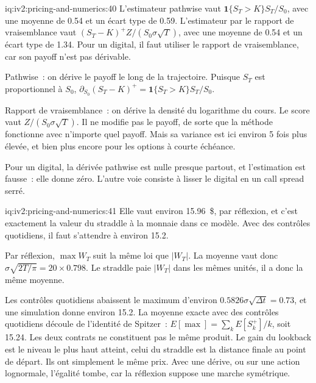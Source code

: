 \begin{solution}{iq:iv2:pricing-and-numerics:40}
L'estimateur pathwise vaut $\mathbf 1\{S_T > K\}S_T/S_0$, avec une moyenne de 0.54 et un écart type de 0.59. L'estimateur par le rapport de vraisemblance vaut $(S_T - K)^+Z/(S_0\sigma\sqrt T)$, avec une moyenne de 0.54 et un écart type de 1.34. Pour un digital, il faut utiliser le rapport de vraisemblance, car son payoff n'est pas dérivable.

Pathwise~: on dérive le payoff le long de la trajectoire. Puisque $S_T$ est proportionnel à $S_0$, $\partial_{S_0}(S_T - K)^+ = \mathbf 1\{S_T > K\}S_T/S_0$.

Rapport de vraisemblance~: on dérive la densité du logarithme du cours. Le score vaut $Z/(S_0\sigma\sqrt T)$. Il ne modifie pas le payoff, de sorte que la méthode fonctionne avec n'importe quel payoff. Mais sa variance est ici environ 5 fois plus élevée, et bien plus encore pour les options à courte échéance.

Pour un digital, la dérivée pathwise est nulle presque partout, et l'estimation est fausse~: elle donne zéro. L'autre voie consiste à lisser le digital en un call spread serré.

\end{solution}

\begin{solution}{iq:iv2:pricing-and-numerics:41}
Elle vaut environ 15.96~\$, par réflexion, et c'est exactement la valeur du straddle à la monnaie dans ce modèle. Avec des contrôles quotidiens, il faut s'attendre à environ 15.2.

Par réflexion, $\max W_T$ suit la même loi que $|W_T|$. La moyenne vaut donc $\sigma\sqrt{2T/\pi} = 20 \times 0.798$. Le straddle paie $|W_T|$ dans les mêmes unités, il a donc la même moyenne.

Les contrôles quotidiens abaissent le maximum d'environ $0.5826\sigma\sqrt{\Delta t} = 0.73$, et une simulation donne environ 15.2. La moyenne exacte avec des contrôles quotidiens découle de l'identité de Spitzer~: $E[\max] = \sum_k E[S_k^+]/k$, soit 15.24. Les deux contrats ne constituent pas le même produit. Le gain du lookback est le niveau le plus haut atteint, celui du straddle est la distance finale au point de départ. Ils ont simplement le même prix. Avec une dérive, ou sur une action lognormale, l'égalité tombe, car la réflexion suppose une marche symétrique.

\end{solution}


